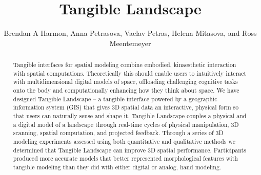 \documentclass[Afour,sageh,times]{sagej}
\begin{document}

\title{Tangible Landscape}

\author{Brendan A Harmon, Anna Petrasova, Vaclav Petras, Helena Mitasova, and Ross Meentemeyer}




\begin{abstract}
Tangible interfaces for spatial modeling
combine embodied, kinaesthetic interaction with spatial computations. 
Theoretically this should enable users to 
intuitively interact 
with multidimensional digital models of space,
offloading challenging cognitive tasks onto the body and 
computationally enhancing how they think about space.
We have designed Tangible Landscape 
-- a tangible interface powered by a geographic information system (GIS) 
that gives 3D spatial data an interactive, physical form so that 
users can naturally sense and shape it.
Tangible Landscape couples a physical and a digital model of a landscape
through real-time cycles of 
physical manipulation, 3D scanning, spatial computation, and projected feedback.
Through a series of 
3D modeling experiments 
assessed using both
quantitative and qualitative methods 
we determined that Tangible Landscape 
can improve 3D spatial performance. 
Participants produced more accurate models 
that better represented morphological features 
with tangible modeling than they did with either digital or analog, hand modeling.
\end{abstract}


\maketitle


\clearpage

\end{document}
